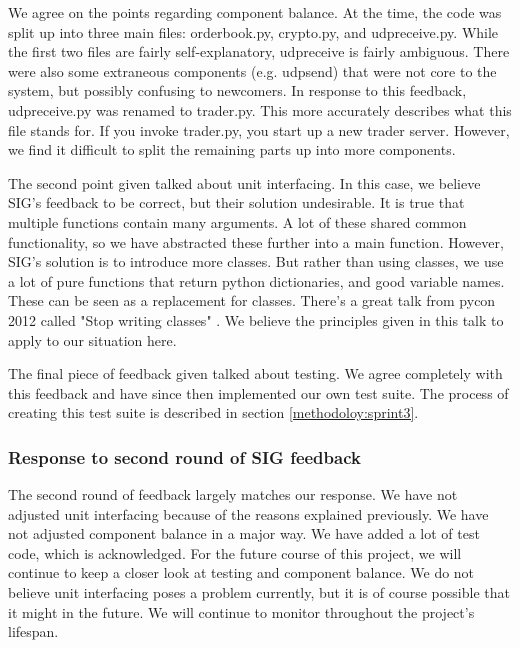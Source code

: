 We agree on the points regarding component balance.
At the time, the code was split up into three main files: orderbook.py, crypto.py, and udpreceive.py.
While the first two files are fairly self-explanatory, udpreceive is fairly ambiguous.
There were also some extraneous components (e.g. udpsend) that were not core to the system, but possibly confusing to newcomers.
In response to this feedback, udpreceive.py was renamed to trader.py.
This more accurately describes what this file stands for.
If you invoke trader.py, you start up a new trader server.
However, we find it difficult to split the remaining parts up into more components.

The second point given talked about unit interfacing.
In this case, we believe SIG's feedback to be correct, but their solution undesirable.
It is true that multiple functions contain many arguments.
A lot of these shared common functionality, so we have abstracted these further into a main function.
However, SIG's solution is to introduce more classes.
But rather than using classes, we use a lot of pure functions that return python dictionaries, and good variable names.
These can be seen as a replacement for classes.
There's a great talk from pycon 2012 called "Stop writing classes" \cite{noclassesvid}.
We believe the principles given in this talk to apply to our situation here.

The final piece of feedback given talked about testing.
We agree completely with this feedback and have since then implemented our own test suite.
The process of creating this test suite is described in section \ref{methodoloy:sprint3}.

\subsubsection{Response to second round of SIG feedback}
The second round of feedback largely matches our response.
We have not adjusted unit interfacing because of the reasons explained previously.
We have not adjusted component balance in a major way.
We have added a lot of test code, which is acknowledged.
For the future course of this project, we will continue to keep a closer look at testing and component balance.
We do not believe unit interfacing poses a problem currently, but it is of course possible that it might in the future.
We will continue to monitor throughout the project's lifespan.